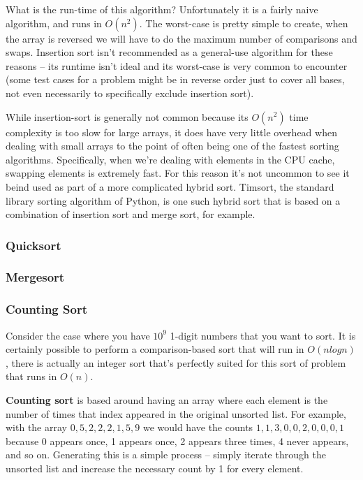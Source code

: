 
What is the run-time of this algorithm? Unfortunately it is a fairly naive algorithm, and runs in $O(n^2)$. The worst-case is pretty simple to create, when the array is reversed we will have to do the maximum number of comparisons and swaps. Insertion sort isn't recommended as a general-use algorithm for these reasons -- its runtime isn't ideal and its worst-case is very common to encounter (some test cases for a problem might be in reverse order just to cover all bases, not even necessarily to specifically exclude insertion sort).

While insertion-sort is generally not common because its $O(n^2)$ time complexity is too slow for large arrays, it does have very little overhead when dealing with small arrays to the point of often being one of the fastest sorting algorithms. Specifically, when we're dealing with elements in the CPU cache, swapping elements is extremely fast. For this reason it's not uncommon to see it beind used as part of a more complicated hybrid sort. Timsort, the standard library sorting algorithm of Python, is one such hybrid sort that is based on a combination of insertion sort and merge sort, for example.

\subsubsection{Quicksort}

\subsubsection{Mergesort}

\subsubsection{Counting Sort}

Consider the case where you have $10^9$ 1-digit numbers that you want to sort. It is certainly possible to perform a comparison-based sort that will run in $O(n log n)$, there is actually an integer sort that's perfectly suited for this sort of problem that runs in $O(n)$.

\textbf{Counting sort} is based around having an array where each element is the number of times that index appeared in the original unsorted list. For example, with the array $0,5,2,2,2,1,5,9$ we would have the counts $1,1,3,0,0,2,0,0,0,1$ because 0 appears once, 1 appears once, 2 appears three times, 4 never appears, and so on. Generating this is a simple process -- simply iterate through the unsorted list and increase the necessary count by 1 for every element.

